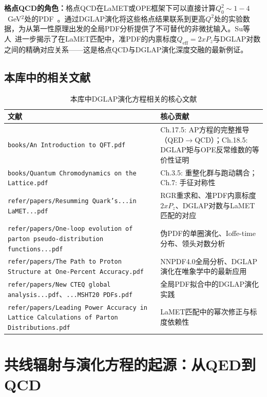 \documentclass[12pt,a4paper]{ctexart}
\theoremstyle{definition}
\begin{document}
\textbf{格点QCD的角色：}格点QCD在LaMET或OPE框架下可以直接计算$Q_0^2 \sim 1-4$~GeV$^2$处的PDF~\cite{Ji2013Euclidean,Ji2014LaMET,Radyushkin2018oneLoop}。通过DGLAP演化将这些格点结果联系到更高$Q^2$处的实验数据，为从第一性原理出发的全局PDF分析提供了不可替代的非微扰输入。Su等人~\cite{Su2023RGR}进一步揭示了在LaMET匹配中，准PDF的内禀标度$Q_{\text{eff}} = 2xP_z$与DGLAP对数之间的精确对应关系——这是格点QCD与DGLAP演化深度交融的最新例证。

\subsection{本库中的相关文献}

\begin{table}[H]
\centering
\caption{本库中DGLAP演化方程相关的核心文献}
\label{tab:DGLAP_papers}
\small
\begin{tabular}{lp{7cm}}
\toprule
文献 & 核心贡献 \\
\midrule
\texttt{books/An Introduction to QFT.pdf} & Ch.17.5: AP方程的完整推导（QED$\to$QCD）；Ch.18.5: DGLAP矩与OPE反常维数的等价性证明 \\
\texttt{books/Quantum Chromodynamics on the Lattice.pdf} & Ch.3.5: 重整化群与跑动耦合；Ch.7: 手征对称性 \\
\texttt{refer/papers/Resumming Quark's...in LaMET...pdf}~\cite{Su2023RGR} &
RGR重求和、准PDF内禀标度$2xP_z$、DGLAP对数与LaMET匹配的对应 \\
\texttt{refer/papers/One-loop evolution of parton pseudo-distribution functions...pdf}~\cite{Radyushkin2018oneLoop} &
伪PDF的单圈演化、Ioffe-time分布、领头对数分析 \\
\texttt{refer/papers/The Path to Proton Structure at One-Percent Accuracy.pdf} &
NNPDF4.0全局分析、DGLAP演化在唯象学中的最新应用 \\
\texttt{refer/papers/New CTEQ global analysis...pdf}、\texttt{...MSHT20 PDFs.pdf} &
全局PDF拟合中的DGLAP演化实践 \\
\texttt{refer/papers/Leading Power Accuracy in Lattice Calculations of Parton Distributions.pdf} &
LaMET匹配中的幂次修正与标度依赖性 \\
\bottomrule
\end{tabular}
\end{table}

\section{共线辐射与演化方程的起源：从QED到QCD}
\end{document}
